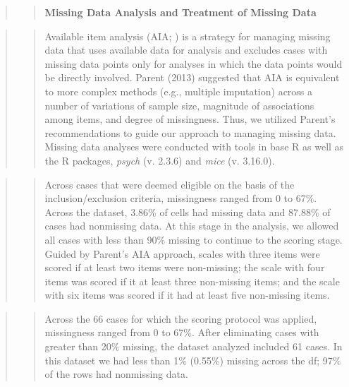 \documentclass[
  11pt,
]{book}
\begin{document}
\begin{quote}
\begin{quote}
\textbf{Missing Data Analysis and Treatment of Missing Data}
\end{quote}
\end{quote}

\begin{quote}
\begin{quote}
Available item analysis (AIA; \citep{parent_handling_2013}) is a strategy for managing missing data that uses available data for analysis and excludes cases with missing data points only for analyses in which the data points would be directly involved. Parent (2013) suggested that AIA is equivalent to more complex methods (e.g., multiple imputation) across a number of variations of sample size, magnitude of associations among items, and degree of missingness. Thus, we utilized Parent's recommendations to guide our approach to managing missing data. Missing data analyses were conducted with tools in base R as well as the R packages, \emph{psych} (v. 2.3.6) and \emph{mice} (v. 3.16.0).
\end{quote}
\end{quote}

\begin{quote}
\begin{quote}
Across cases that were deemed eligible on the basis of the inclusion/exclusion criteria, missingness ranged from 0 to 67\%. Across the dataset, 3.86\% of cells had missing data and 87.88\% of cases had nonmissing data. At this stage in the analysis, we allowed all cases with less than 90\% missing to continue to the scoring stage. Guided by Parent's \citeyearpar{parent_handling_2013} AIA approach, scales with three items were scored if at least two items were non-missing; the scale with four items was scored if it at least three non-missing items; and the scale with six items was scored if it had at least five non-missing items.
\end{quote}
\end{quote}

\begin{quote}
\begin{quote}
Across the 66 cases for which the scoring protocol was applied, missingness ranged from 0 to 67\%. After eliminating cases with greater than 20\% missing, the dataset analyzed included 61 cases. In this dataset we had less than 1\% (0.55\%) missing across the df; 97\% of the rows had nonmissing data.
\end{quote}
\end{quote}
\end{document}
